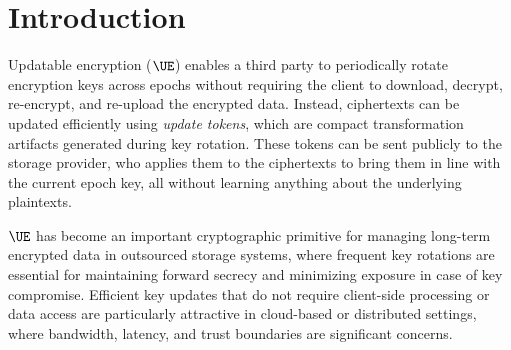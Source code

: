 \documentclass{fundam}
\begin{document}
\section{Introduction}

Updatable encryption ($\UE$) enables a third party to periodically rotate encryption keys across epochs without requiring the client to download, decrypt, re-encrypt, and re-upload the encrypted data. Instead, ciphertexts can be updated efficiently using \emph{update tokens}, which are compact transformation artifacts generated during key rotation. These tokens can be sent publicly to the storage provider, who applies them to the ciphertexts to bring them in line with the current epoch key, all without learning anything about the underlying plaintexts.

$\UE$ has become an important cryptographic primitive for managing long-term encrypted data in outsourced storage systems, where frequent key rotations are essential for maintaining forward secrecy and minimizing exposure in case of key compromise. Efficient key updates that do not require client-side processing or data access are particularly attractive in cloud-based or distributed settings, where bandwidth, latency, and trust boundaries are significant concerns.
\end{document}
